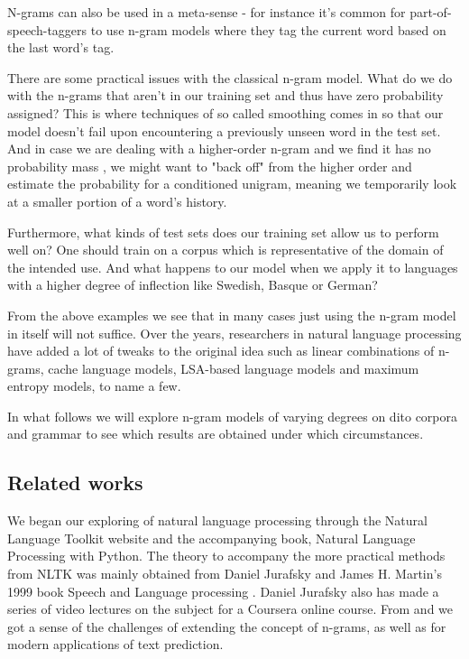 \documentclass[a4paper,12pt]{article}
\begin{document}
N-grams can also be used in a meta-sense - for instance it's common for part-of-speech-taggers to use n-gram models where they tag the current word based on the last word's tag.

There are some practical issues with the classical n-gram model. What do we do with the n-grams that aren't in our training set and thus have zero probability assigned? This is where techniques of so called smoothing comes in so that our model doesn't fail upon encountering a previously unseen word in the test set. And in case we are dealing with a higher-order n-gram and we find it has no probability mass , we might want to "back off" from the higher order and estimate the probability for a conditioned unigram, meaning we temporarily look at a smaller portion of a word's history.

Furthermore, what kinds of test sets does our training set allow us to perform well on? One should train on a  corpus which is representative of the domain of the intended use. And what happens to our model when we apply it to languages with a higher degree of inflection like Swedish, Basque or German?

From the above examples we see that in many cases just using the n-gram model in itself will not suffice. Over the years, researchers in natural language processing have added a lot of tweaks to the original idea such as linear combinations of n-grams, cache language models, LSA-based language models and maximum entropy models, to name a few.

In what follows we will explore n-gram models of varying degrees on dito corpora and grammar to see which results are obtained under which circumstances.

\subsection{Related works}
We began our exploring of natural language processing through the Natural Language Toolkit website and the accompanying book, Natural Language Processing with Python. The theory to accompany the more practical methods from NLTK was mainly obtained from Daniel Jurafsky and James H. Martin's 1999 book Speech and Language processing \cite{JurafskyBook}. Daniel Jurafsky also has made a series of video lectures on the subject for a Coursera online course. From \cite{brown1992class} and \cite{garay2006text} we got a sense of the challenges of extending the concept of n-grams, as well as for modern applications of text prediction.
\end{document}
